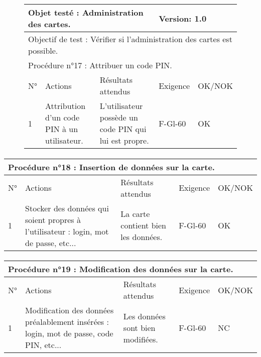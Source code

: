 \documentclass[a4paper,11pt,french]{article}
\begin{document}
\begin{figure}[!h]
\begin{tabular}{|p{1cm}|p{5cm}|p{5cm}|p{2cm}|p{2cm}|}
\hline
\multicolumn{3}{|l|}{Objet testé : Administration des cartes.} & \multicolumn{2}{|l|}{Version: 1.0} \\
\hline
\multicolumn{5}{|l|}{Objectif de test : Vérifier si l'administration des cartes est possible.} \\
\hline
\multicolumn{5}{|l|}{Procédure n°17 : Attribuer un code PIN.} \\
\hline
N° & Actions & Résultats attendus & Exigence & OK/NOK \\
\hline
1 & Attribution d'un code PIN à un utilisateur. & L'utilisateur possède un code PIN qui lui est propre. & F-Gl-60 & OK \\
\hline
\end{tabular}
\end{figure}

\paragraph{}
\begin{tabular}{|p{1cm}|p{5cm}|p{5cm}|p{2cm}|p{2cm}|}
\hline
\multicolumn{5}{|l|}{Procédure n°18 : Insertion de données sur la carte.} \\
\hline
N° & Actions & Résultats attendus & Exigence & OK/NOK \\
\hline
1 & Stocker des données qui soient propres à l'utilisateur : login, mot de passe, etc... & La carte contient bien les données. & F-Gl-60 & OK \\
\hline
\end{tabular}

\paragraph{}
\begin{tabular}{|p{1cm}|p{5cm}|p{5cm}|p{2cm}|p{2cm}|}
\hline
\multicolumn{5}{|l|}{Procédure n°19 : Modification des données sur la carte.} \\
\hline
N° & Actions & Résultats attendus & Exigence & OK/NOK \\
\hline
1 & Modification des données préalablement insérées : login, mot de passe, code PIN, etc... & Les données sont bien modifiées. & F-Gl-60 & NC \\
\hline
\end{tabular}
\end{document}
